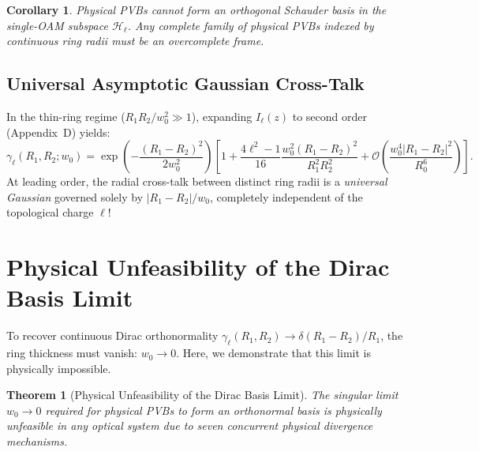 \documentclass[11pt,a4paper]{article}
\newtheorem{theorem}{Theorem}
\newtheorem{corollary}{Corollary}
\begin{document}
\begin{corollary}
Physical PVBs cannot form an orthogonal Schauder basis in the single-OAM subspace $\mathcal{H}_\ell$. Any complete family of physical PVBs indexed by continuous ring radii must be an overcomplete frame.
\end{corollary}

\subsection{Universal Asymptotic Gaussian Cross-Talk}

In the thin-ring regime ($R_1 R_2 / w_0^2 \gg 1$), expanding $I_\ell(z)$ to second order (Appendix~D) yields:
\begin{equation}
\boxed{\gamma_\ell(R_1, R_2; w_0) = \exp\left(-\frac{(R_1 - R_2)^2}{2 w_0^2}\right) \left[ 1 + \frac{4\ell^2 - 1}{16} \frac{w_0^2 (R_1 - R_2)^2}{R_1^2 R_2^2} + \mathcal{O}\left(\frac{w_0^4 |R_1 - R_2|^2}{R_0^6}\right) \right].}
\label{eq:asymptotic_overlap}
\end{equation}
At leading order, the radial cross-talk between distinct ring radii is a \emph{universal Gaussian} governed solely by $|R_1 - R_2| / w_0$, completely independent of the topological charge $\ell$!

\section{Physical Unfeasibility of the Dirac Basis Limit}
\label{sec:unfeasibility}

To recover continuous Dirac orthonormality $\gamma_\ell(R_1, R_2) \to \delta(R_1 - R_2) / R_1$, the ring thickness must vanish: $w_0 \to 0$. Here, we demonstrate that this limit is physically impossible.

\begin{theorem}[Physical Unfeasibility of the Dirac Basis Limit]
The singular limit $w_0 \to 0$ required for physical PVBs to form an orthonormal basis is physically unfeasible in any optical system due to seven concurrent physical divergence mechanisms.
\end{theorem}
\end{document}
